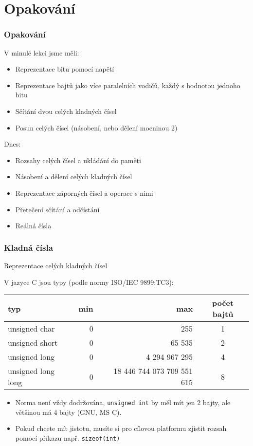 \documentclass{beamer}
\subtitle{Lekce 02. Reprezentace čísel}
\author{Petr Štěpán\\ \small\texttt{stepan@fel.cvut.cz}}
\begin{document}
\maketitle

\section{Opakování}


\begin{frame}
\frametitle{Opakování}
V minulé lekci jsme měli:
\begin{itemize}
\item Reprezentace bitu pomocí napětí
\item Reprezentace bajtů jako více paralelních vodičů, každý s hodnotou jednoho bitu
\item Sčítání dvou celých kladných čísel
\item Posun celých čísel (násobení, nebo dělení mocninou 2)
\end{itemize}

Dnes:
\begin{itemize}
\item Rozsahy celých čísel a ukládání do paměti
\item Násobení a dělení celých kladných čísel 
\item Reprezentace záporných čísel a operace s nimi
\item Přetečení sčítání a odčístání
\item Reálná čísla
\end{itemize}

\end{frame}


\begin{frame}
\frametitle{Kladná čísla}
Reprezentace celých kladných čísel

V jazyce C jsou typy (podle normy ISO/IEC 9899:TC3):
\begin{tabular}{|l|r|r|c|}\hline
typ & min & max & počet bajtů\\ \hline
unsigned char & 0 & 255 & 1 \\ \hline
unsigned short & 0 & 65 535 & 2 \\ \hline 
unsigned long & 0 & 4 294 967 295 & 4 \\ \hline
unsigned long long & 0 & 18 446 744 073 709 551 615 & 8 \\ \hline
\end{tabular}

\begin{itemize}
\item Norma není vždy dodržována, \texttt{unsigned int} by měl mít jen 2 bajty, ale většinou má 4 bajty (GNU, MS C).
\item Pokud chcete mít jistotu, musíte si pro cílovou platformu zjistit rozsah pomocí příkazu např. \texttt{sizeof(int)}
\end{itemize}

\end{frame}
\end{document}
